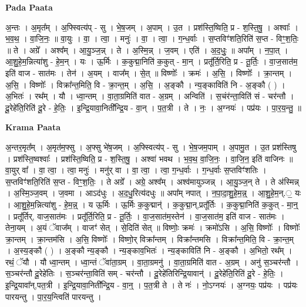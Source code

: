 \documentclass[17pt]{extarticle}
\begin{document}
\textbf{Pada Paata} \newline

अ॒न्तः । अ॒मृत᳚म् । अ॒फ्स्वित्य॑प् - सु । भे॒ष॒जम् । अ॒पाम् । उ॒त । प्रश॑स्ति॒ष्विति॒ प्र - श॒स्ति॒षु॒ । अश्वाः᳚ । भ॒व॒थ॒ । वा॒जि॒नः॒ ॥ वा॒युः । वा॒ । त्वा॒ । मनुः॑ । वा॒ । त्वा॒ । ग॒न्ध॒र्वाः । स॒प्तविꣳ॑शति॒रिति॑ स॒प्त - विꣳ॒॒श॒तिः॒ ॥ ते । अग्रे᳚ । अश्व᳚म् । आ॒यु॒ञ्ज॒न्न् । ते । अ॒स्मि॒न्न् । ज॒वम् । एति॑ । अ॒द॒धुः॒ ॥ अपा᳚म् । न॒पा॒त् । आ॒शु॒हे॒म॒न्नित्या॑शु - हे॒म॒न् । यः । ऊ॒र्मिः । क॒कुद्मा॒निति॑ क॒कुत् - मा॒न् । प्रतू᳚र्ति॒रिति॒ प्र - तू॒र्तिः॒ । वा॒ज॒सात॑म॒ इति॑ वाज - सात॑मः । तेन॑ । अ॒यम् । वाज᳚म् । से॒त् ॥ विष्णोः᳚ । क्रमः॑ । अ॒सि॒ । विष्णोः᳚ । क्रा॒न्तम् । अ॒सि॒ । विष्णोः᳚ । विक्रा᳚न्त॒मिति॒ वि - क्रा॒न्त॒म् । अ॒सि॒ । अ॒ङ्कौ । न्य॒ङ्काविति॑ नि - अ॒ङ्कौ ( ) । अ॒भितः॑ । रथ᳚म् । यौ । ध्वा॒न्तम् । वा॒ता॒ग्रमिति॑ वात - अ॒ग्रम् । अन्विति॑ । स॒चंर॑न्ता॒विति॑ सं - चर॑न्तौ । दू॒रेहे॑ति॒रिति॑ दू॒रे - हे॒तिः॒ । इ॒न्द्रि॒यावा॒निती᳚न्द्रि॒य - वा॒न् । प॒त॒त्री । ते । नः॒ । अ॒ग्नयः॑ । पप्र॑यः । पा॒र॒य॒न्तु॒ ॥  \newline


\textbf{Krama Paata} \newline

अ॒न्तर॒मृत᳚म् । अ॒मृत॑म॒फ्सु । अ॒फ्सु भे॑ष॒जम् । अ॒फ्स्वित्य॑प् - सु । भे॒ष॒जम॒पाम् । अ॒पामु॒त । उ॒त प्रश॑स्तिषु । प्रश॑स्ति॒ष्वश्वाः᳚ । प्रश॑स्ति॒ष्विति॒ प्र - श॒स्ति॒षु॒ । अश्वा॑ भवथ । भ॒व॒थ॒ वा॒जि॒नः॒ । वा॒जि॒न॒ इति॑ वाजिनः ॥ वा॒युर् वा᳚ । वा॒ त्वा॒ । त्वा॒ मनुः॑ । मनु॑र् वा । वा॒ त्वा॒ । त्वा॒ ग॒न्ध॒र्वाः । ग॒न्ध॒र्वाः स॒प्तविꣳ॑शतिः । स॒प्तविꣳ॑शति॒रिति॑ स॒प्त - विꣳ॒॒श॒तिः॒ । ते अग्रे᳚ । अग्रे॒ अश्व᳚म् । अश्व॑मायुञ्जन्न् । आ॒यु॒ञ्ज॒न् ते । ते अ॑स्मिन्न् । अ॒स्मि॒ञ्ज॒वम् । ज॒वमा । आऽद॑धुः । अ॒द॒धु॒रित्य॑दधुः ॥ अपा᳚म् नपात् । न॒पा॒दा॒शु॒हे॒म॒न्न्॒ । आ॒शु॒हे॒म॒न्.॒ यः । आ॒शु॒हे॒म॒न्नित्या॑शु - हे॒म॒न्न्॒ । य ऊ॒र्मिः । ऊ॒र्मिः क॒कुद्मान्॑ । क॒कुद्मा॒न्,प्रतू᳚र्तिः । क॒कुद्मा॒निति॑ क॒कुत् - मा॒न्॒ । प्रतू᳚र्तिर्,
वाज॒सात॑मः । प्रतू᳚र्ति॒रिति॒ प्र - तू॒र्तिः॒ । वा॒ज॒सात॑म॒स्तेन॑ । वा॒ज॒सात॑म॒ इति॑ वाज - सात॑मः । तेना॒यम् । अ॒यं ॅवाज᳚म् । वाजꣳ॑ सेत् । से॒दिति॑ सेत् ॥ विष्णोः॒ क्रमः॑ । क्रमो॑ऽसि । अ॒सि॒ विष्णोः᳚ । विष्णोः᳚ क्रा॒न्तम् । क्रा॒न्तम॑सि । अ॒सि॒ विष्णोः᳚ । विष्णो॒र् विक्रा᳚न्तम् । विक्रा᳚न्तमसि । विक्रा᳚न्त॒मिति॒ वि - क्रा॒न्त॒म् । अ॒स्य॒ङ्कौ ( ) । अ॒ङ्कौ न्य॒ङ्कौ । न्य॒ङ्काव॒भितः॑ । न्य॒ङ्काविति॑ नि - अ॒ङ्कौ । अ॒भितो॒ रथ᳚म् । रथं॒ ॅयौ । यौ ध्वा॒न्तम् । ध्वा॒न्तं ॅवा॑ता॒ग्रम् । वा॒ता॒ग्रमनु॑ । वा॒ता॒ग्रमिति॑ वात - अ॒ग्रम् । अनु॑ स॒ञ्चर॑न्तौ । स॒ञ्चर॑न्तौ दू॒रेहे॑तिः । स॒ञ्चर॑न्ता॒विति॑ सम् - चर॑न्तौ । दू॒रेहे॑तिरिन्द्रि॒यावान्॑ । दू॒रेहे॑ति॒रिति॑ दू॒रे - हे॒तिः॒ । इ॒न्द्रि॒यावा᳚न्,पत॒त्री । इ॒न्द्रि॒यावा॒निती᳚न्द्रि॒य - वा॒न्॒ । प॒त॒त्री ते । ते नः॑ । नो॒ऽग्नयः॑ । अ॒ग्नयः॒ पप्र॑यः । पप्र॑यः पारयन्तु । पा॒र॒य॒न्त्विति॑ पारयन्तु । \newline
\end{document}
